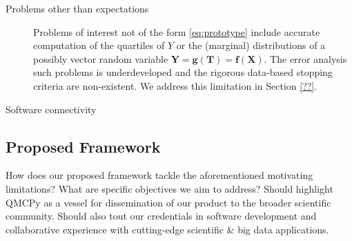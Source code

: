 \documentclass[11pt]{NSFamsart}
\newcommand{\cmtS}[1]{{\color{blue}{(Simon: #1)}}}
\newcommand{\bff}{{\boldsymbol{f}}}
\newcommand{\bT}{{\boldsymbol{T}}}
\newcommand{\bX}{{\boldsymbol{X}}}
\newcommand{\bg}{{\boldsymbol{g}}}
\newcommand{\bY}{{\boldsymbol{Y}}}
\begin{document}
\begin{description}
\item[Problems other than expectations] Problems of interest not of the  form \eqref{eq:prototype} include accurate computation of the quartiles of $Y$ or the (marginal) distributions of a possibly vector random variable $\bY = \bg(\bT) = \bff(\bX)$.  The error analysis such problems is underdeveloped and the rigorous data-based stopping criteria are non-existent. We address this limitation in Section \ref{??}.

\item[Software connectivity] 

\end{description}


\subsection{Proposed Framework} How does our proposed framework tackle the aforementioned motivating limitations? What are specific objectives we aim to address? Should highlight QMCPy as a vessel for dissemination of our product to the broader scientific community. Should also tout our credentials in software development and collaborative experience with cutting-edge scientific \& big data applications. \cmtS{add workflow figure going from applications to tasks.}

\end{document}
